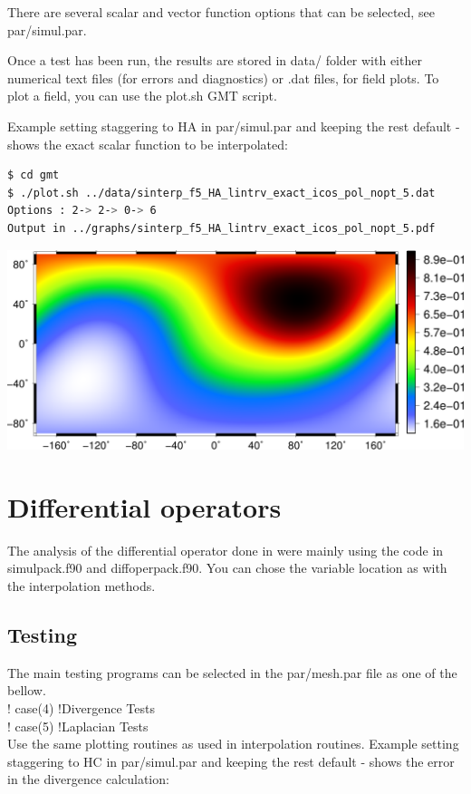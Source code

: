\documentclass[a4paper,10pt]{article}
\begin{document}
There are several scalar and vector function options that can be selected, see par/simul.par.

Once a test has been run, the results are stored in data/ folder with either numerical text files (for errors and diagnostics) or .dat files, for field plots. To plot a field, you can use the plot.sh GMT script. 

Example setting staggering to HA in par/simul.par and keeping the rest default - shows the exact scalar function to be interpolated:
\begin{lstlisting}[language=bash]
$ cd gmt
$ ./plot.sh ../data/sinterp_f5_HA_lintrv_exact_icos_pol_nopt_5.dat 
Options : 2-> 2-> 0-> 6
Output in ../graphs/sinterp_f5_HA_lintrv_exact_icos_pol_nopt_5.pdf
\end{lstlisting}
\includegraphics[scale=0.5]{sinterp_f5_HA_lintrv_exact_icos_pol_nopt_5}


\section{Differential operators}

The analysis of the differential operator done in \cite{Peixoto2013} were mainly using the code in simulpack.f90 and diffoperpack.f90. You can chose the variable location as with the interpolation methods.

\subsection{Testing}
The main testing programs can be selected in the par/mesh.par file as one of the bellow.\\
!  case(4) !Divergence Tests\\
!  case(5) !Laplacian Tests\\

Use the same plotting routines as used in interpolation routines. Example setting staggering to HC in par/simul.par and keeping the rest default - shows the error in the divergence calculation:
\end{document}
